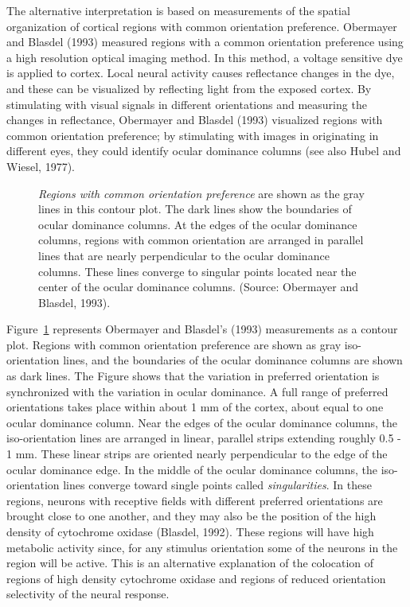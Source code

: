 The alternative interpretation is based on measurements
of the spatial organization
of cortical regions with common orientation preference.
Obermayer and Blasdel (1993)
measured regions with a common orientation preference
using a high resolution optical imaging method.
In this method, a voltage sensitive dye is applied to cortex.
Local neural activity causes
reflectance changes in the dye, and these can be
visualized by reflecting light from the exposed cortex.
By stimulating with visual signals in different orientations
and measuring the changes in reflectance,
Obermayer and Blasdel (1993) visualized regions
with common orientation preference;
by stimulating with images in originating in different eyes,
they could identify ocular dominance columns
(see also Hubel and Wiesel, 1977).

\begin{figure}
\centerline{
}
\caption[Iso-orientation lines and ocular dominance columns]{
{\em Regions with common orientation preference}
are shown as the gray lines in this contour plot.
The dark lines show the boundaries of ocular dominance columns.
At the edges of the ocular dominance columns, regions with
common orientation are arranged in parallel lines that
are nearly perpendicular to the ocular dominance columns.
These lines converge to singular points located near the
center of the ocular dominance columns.
(Source:  Obermayer and Blasdel, 1993).
}
\label{fig:isoOrientation}
\end{figure}
Figure~\ref{fig:isoOrientation} represents
Obermayer and Blasdel's (1993) measurements 
as a contour plot.
Regions with common orientation preference are shown
as gray iso-orientation lines, and
the boundaries of the ocular dominance columns are shown
as dark lines.
The Figure shows that
the variation in preferred orientation is synchronized with
the variation in ocular dominance.
A full range of preferred orientations
takes place within about 1 mm of the cortex,
about equal to one ocular dominance column.
Near the edges of the ocular dominance columns,
the iso-orientation lines
are arranged in linear, parallel strips
extending roughly 0.5 - 1 mm.
These linear strips are oriented nearly perpendicular to the edge
of the ocular dominance edge.
In the middle of the ocular dominance columns, the
iso-orientation lines converge toward single points
called {\em singularities}.
In these regions, neurons with receptive fields with
different preferred orientations are brought close to one another,
and they may also be the position
of the high density of cytochrome oxidase (Blasdel, 1992).  %
These regions will have high metabolic
activity since, for any stimulus orientation
some of the neurons in the region will be active.
This is an alternative explanation of the
colocation of regions of high density cytochrome oxidase and 
regions of reduced orientation selectivity of the neural response.

